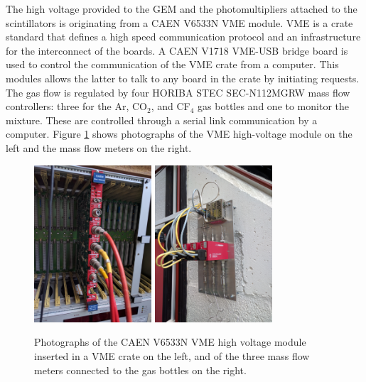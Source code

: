     The high voltage provided to the GEM and the photomultipliers attached to the scintillators is originating from a CAEN V6533N VME module. VME \cite{VMEBUS-ANSI} is a crate standard that defines a high speed communication protocol and an infrastructure for the interconnect of the boards. A CAEN V1718 VME-USB bridge board is used to control the communication of the VME crate from a computer. This modules allows the latter to talk to any board in the crate by initiating requests. The gas flow is regulated by four HORIBA STEC SEC-N112MGRW mass flow controllers: three for the Ar, CO$_2$, and CF$_4$ gas bottles and one to monitor the mixture. These are controlled through a serial link communication by a computer. Figure \ref{fig:III-1-gas-hv} shows photographs of the VME high-voltage module on the left and the mass flow meters on the right.

    \begin{figure}[b!]
      \centering
      \includegraphics[width=0.39\textwidth]{img/III-1-arch/hv.jpg}
      \includegraphics[width=0.39\textwidth]{img/III-1-arch/gas.jpg}
      \caption{Photographs of the CAEN V6533N VME high voltage module inserted in a VME crate on the left, and of the three mass flow meters connected to the gas bottles on the right.}
      \label{fig:III-1-gas-hv}
    \end{figure}


